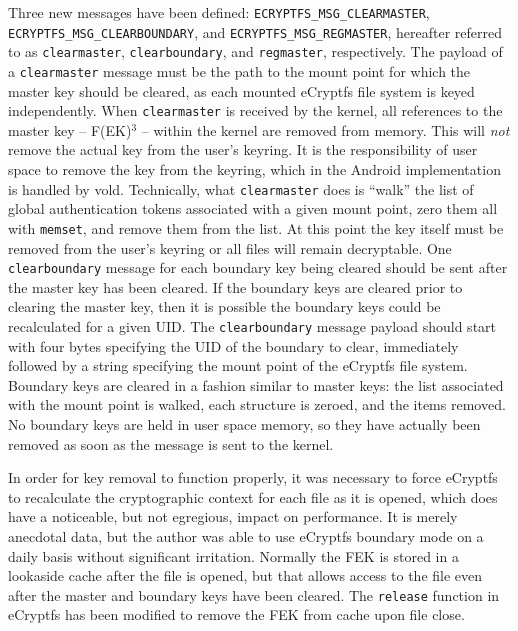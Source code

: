 Three new messages have been defined: \texttt{ECRYPTFS\_MSG\_CLEARMASTER}, \texttt{ECRYPTFS\_MSG\_CLEARBOUNDARY}, and
\texttt{ECRYPTFS\_MSG\_REGMASTER}, hereafter referred to as \texttt{clearmaster}, \texttt{clearboundary}, and \texttt{regmaster},
respectively. The payload of a \texttt{clearmaster} message must be the path to the mount point for which the master key should be
cleared, as each mounted eCryptfs file system is keyed independently. When \texttt{clearmaster} is received by the kernel, all
references to the master key -- F(EK)$^{3}$ -- within the kernel are removed from memory. This will \emph{not} remove the
actual key from the user's keyring. It is the responsibility of user space to remove the key from the keyring, which in the Android
implementation is handled by vold.  Technically, what \texttt{clearmaster} does is ``walk'' the list of global
authentication tokens associated with a given mount point, zero them all with \texttt{memset}, and remove them from the list.  At
this point the key itself must be removed from the user's keyring or all files will remain decryptable. One \texttt{clearboundary}
message for each boundary key being cleared should be sent after the master key has been cleared. If the boundary keys are cleared
prior to clearing the master key, then it is possible the boundary keys could be recalculated for a given UID. The
\texttt{clearboundary} message payload should start with four bytes specifying the UID of the boundary to clear, immediately
followed by a string specifying the mount point of the eCryptfs file system. Boundary keys are cleared in a fashion similar to master
keys: the list associated with the mount point is walked, each structure is zeroed, and the items removed.  No boundary keys are
held in user space memory, so they have actually been removed as soon as the message is sent to the kernel. 

In order for key removal to function properly, it was necessary to force eCryptfs to recalculate the cryptographic context for each
file as it is opened, which does have a noticeable, but not egregious, impact on performance. It is merely anecdotal data, but the
author was able to use eCryptfs boundary mode on a daily basis without significant irritation.  Normally the FEK is stored in a
lookaside cache after the file is opened, but that allows access to the file even after the master and boundary keys have been
cleared. The \texttt{release} function in eCryptfs has been modified to remove the FEK from cache upon file close.

